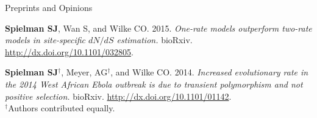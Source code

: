 \documentclass{resume} %
\begin{document}


\vspace*{0.5cm}
\begin{rSection}{Preprints and Opinions}	
\vspace*{0.25cm}
	
\begin{etaremune}[leftmargin=1.5em]
	
\item \textbf{Spielman SJ}, Wan S, and Wilke CO. 2015. \emph{One-rate models outperform two-rate models in site-specific $dN/dS$ estimation.} bioRxiv. \href{http://dx.doi.org/10.1101/032805}{http://dx.doi.org/10.1101/032805}.

\item \textbf{Spielman SJ}$^\dagger$, Meyer, AG$^\dagger$, and Wilke CO. 2014. \emph{Increased evolutionary rate in the 2014 West African Ebola outbreak is due to transient polymorphism and not 
positive selection.} bioRxiv. \href{http://dx.doi.org/10.1101/01142}{http://dx.doi.org/10.1101/01142}. 
\\\noindent$^\dagger$Authors contributed equally.
			
\end{etaremune}

	
\end{rSection}



\end{document}
